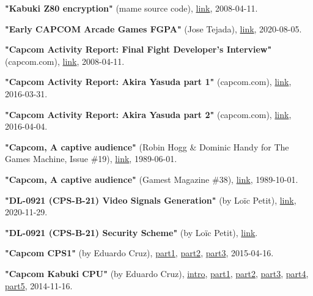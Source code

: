 \begin{thebibliography}{999}
  \textbf{"Kabuki Z80 encryption"} (mame source code),
  \href{https://github.com/mamedev/historic-mame/blob/master/src/mame/machine/kabuki.c}{link},
  2008-04-11.


  \textbf{"Early CAPCOM Arcade Games FGPA"} (Jose Tejada),
  \href{https://github.com/jotego/jt_gng/blob/fb92e5ac0f72323638974034ad652649b6efafcb/README.md}{link},
  2020-08-05.

  \textbf{"Capcom Activity Report: Final Fight Developer's Interview"} (capcom.com),
  \href{https://game.capcom.com/cfn/sfv/column/132673?lang=en}{link},
  2008-04-11.

  \textbf{"Capcom Activity Report: Akira Yasuda part 1"} (capcom.com),
  \href{https://game.capcom.com/cfn/sfv/column/112429}{link},
  2016-03-31.

  \textbf{"Capcom Activity Report: Akira Yasuda part 2"} (capcom.com),
  \href{https://game.capcom.com/cfn/sfv/column/112432}{link},
  2016-04-04.

  \textbf{"Capcom, A captive audience"} (Robin Hogg \& Dominic Handy for The Games Machine, Issue \#19),
  \href{https://archive.org/details/the-games-machine-19/page/n23/mode/2up}{link},
  1989-06-01.

  \textbf{"Capcom, A captive audience"} (Gamest Magazine \#38),
  \href{https://retrocdn.net/images/9/91/Gamest_JP_038.pdf}{link},
  1989-10-01.

  \textbf{"DL-0921 (CPS-B-21) Video Signals Generation"} (by Lo\"{i}c Petit),
  \href{https://gitlab.com/loic.petit/cps2-reverse/-/blob/master/DLs/DL-0921/doc/video-signals.md}{link},
  2020-11-29.

  \textbf{"DL-0921 (CPS-B-21) Security Scheme"} (by Lo\"{i}c Petit),
  \href{https://gitlab.com/loic.petit/cps2-reverse/-/blob/master/DLs/DL-0921/doc/security-scheme.md}{link}.

  \textbf{"Capcom CPS1"} (by Eduardo Cruz),
  \href{http://arcadehacker.blogspot.com/2015/04/capcom-cps1-part-1.html}{part1},
  \href{http://arcadehacker.blogspot.com/2015/05/capcom-cps1-part-2.html}{part2},
  \href{http://arcadehacker.blogspot.com/2015/06/capcom-cps1-part-3.html}{part3},
  2015-04-16.
  
  \textbf{"Capcom Kabuki CPU"} (by Eduardo Cruz),
  \href{ http://arcadehacker.blogspot.com/2014/11/capcom-kabuki-cpu-intro.html}{intro},
  \href{http://arcadehacker.blogspot.com/2014/11/capcom-kabuki-cpu-part-1.html}{part1},
  \href{http://arcadehacker.blogspot.com/2014/11/capcom-kabuki-cpu-part-2.html}{part2},
  \href{http://arcadehacker.blogspot.com/2014/11/capcom-kabuki-cpu-part-3.html}{part3},
  \href{http://arcadehacker.blogspot.com/2014/11/capcom-kabuki-cpu-part-4.html}{part4},
  \href{http://arcadehacker.blogspot.com/2014/11/capcom-kabuki-cpu-part-5.html}{part5},
  2014-11-16.


\end{thebibliography}
